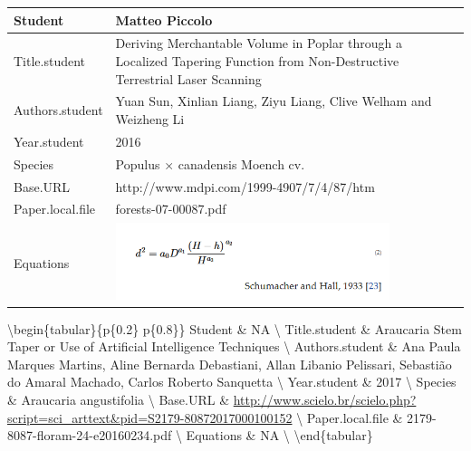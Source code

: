 \documentclass[]{article}
\begin{document}
\begin{tabular}{p{} p{}}
\hline
Student & Matteo Piccolo \\ \hline
Title.student & Deriving Merchantable Volume in Poplar through a Localized Tapering Function from Non-Destructive Terrestrial Laser Scanning \\ \hline
Authors.student & Yuan Sun, Xinlian Liang, Ziyu Liang, Clive Welham and Weizheng Li \\ \hline
Year.student & 2016 \\ \hline
Species & Populus × canadensis Moench cv. \\ \hline
Base.URL & http://www.mdpi.com/1999-4907/7/4/87/htm \\ \hline
Paper.local.file & forests-07-00087.pdf \\ \hline
Equations & \includegraphics[width=0.8\textwidth]{Equations/2016Sunetal.png} \\ \hline
\end{tabular}


\textbackslash{}begin\{tabular\}\{p\{0.2\textwidth\}
p\{0.8\textwidth\}\} \hline Student \& NA \textbackslash{} \hline
Title.student \& Araucaria Stem Taper or Use of Artificial Intelligence
Techniques \textbackslash{} \hline Authors.student \& Ana Paula Marques
Martins, Aline Bernarda Debastiani, Allan Libanio Pelissari, Sebastião
do Amaral Machado, Carlos Roberto Sanquetta \textbackslash{} \hline
Year.student \& 2017 \textbackslash{} \hline Species \& Araucaria
angustifolia \textbackslash{} \hline Base.URL \&
\url{http://www.scielo.br/scielo.php?script=sci_arttext\&pid=S2179-80872017000100152}
\textbackslash{} \hline Paper.local.file \&
2179-8087-floram-24-e20160234.pdf \textbackslash{} \hline Equations \&
NA \textbackslash{} \hline \textbackslash{}end\{tabular\}
\end{document}
